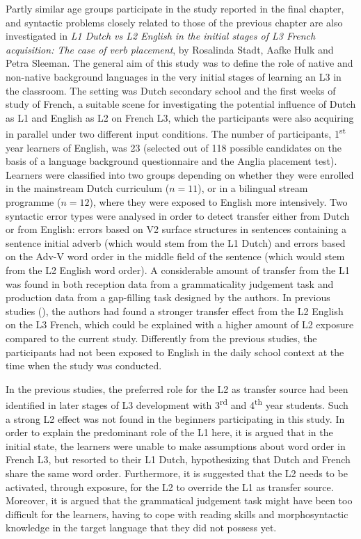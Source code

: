 \documentclass[output=paper,colorlinks,citecolor=brown,nonflat]{langsci/langscibook}
\begin{document}
Partly similar age groups participate in the study reported in the final chapter, and syntactic problems closely related to those of the previous chapter are also investigated in \textit{L1 Dutch vs L2 English in the initial stages of L3 French acquisition: The case of verb placement}, by Rosalinda Stadt, Aafke Hulk and Petra Sleeman. The general aim of this study was to define the role of native and non-native background languages in the very initial stages of learning an L3 in the classroom. The setting was Dutch secondary school and the first weeks of study of French, a suitable scene for investigating the potential influence of Dutch as L1 and English as L2 on French L3, which the participants were also acquiring in parallel under two different input conditions. The number of participants, 1\textsuperscript{st} year learners of English, was 23 (selected out of 118 possible candidates on the basis of a language background questionnaire and the Anglia placement test). Learners were classified into two groups depending on whether they were enrolled in the mainstream Dutch curriculum ($n = 11$), or in a bilingual stream programme ($n = 12$), where they were exposed to English more intensively. Two syntactic error types were analysed in order to detect transfer either from Dutch or from English: errors based on V2 surface structures in sentences containing a sentence initial adverb (which would stem from the L1 Dutch) and errors based on the Adv-V word order in the middle field of the sentence (which would stem from the L2 English word order). A considerable amount of transfer from the L1 was found in both reception data from a grammaticality judgement task and production data from a gap-filling task designed by the authors. In previous studies (\citealt{StadtEtAl2016, StadtEtAl2018Exposure}), the authors had found a stronger transfer effect from the L2 English on the L3 French, which could be explained with a higher amount of L2 exposure compared to the current study. Differently from the previous studies, the participants had not been exposed to English in the daily school context at the time when the study was conducted.

In the previous studies, the preferred role for the L2 as transfer source had been identified in later stages of L3 development with 3\textsuperscript{rd} and 4\textsuperscript{th} year students. Such a strong L2 effect was not found in the beginners participating in this study. In order to explain the predominant role of the L1 here, it is argued that in the initial state, the learners were unable to make assumptions about word order in French L3, but resorted to their L1 Dutch, hypothesizing that Dutch and French share the same word order. Furthermore, it is suggested that the L2 needs to be activated, through exposure, for the L2 to override the L1 as transfer source. Moreover, it is argued that the grammatical judgement task might have been too difficult for the learners, having to cope with reading skills and morphosyntactic knowledge in the target language that they did not possess yet.
\end{document}
